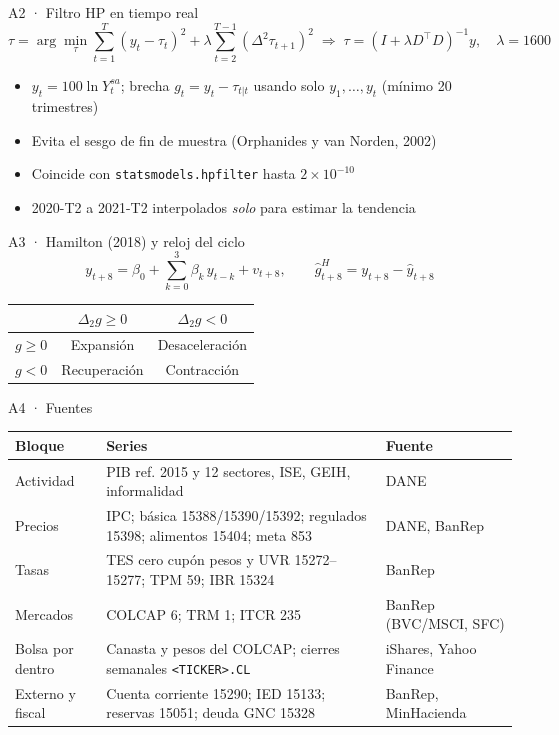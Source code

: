 \documentclass[aspectratio=169,11pt]{beamer}
\begin{document}
\begin{frame}{A2 · Filtro HP en tiempo real}
\[
\tau=\arg\min_{\tau}\sum_{t=1}^{T}(y_t-\tau_t)^2+\lambda\sum_{t=2}^{T-1}(\Delta^2\tau_{t+1})^2
\;\Rightarrow\; \tau=(I+\lambda D^\top D)^{-1}y,\quad \lambda=1600
\]
\begin{itemize}\small
\item $y_t=100\ln Y^{sa}_t$; brecha $g_t=y_t-\tau_{t|t}$ usando solo $y_1,\dots,y_t$ (mínimo 20 trimestres)
\item Evita el sesgo de fin de muestra (Orphanides y van Norden, 2002)
\item Coincide con \texttt{statsmodels.hpfilter} hasta $2\times10^{-10}$
\item 2020-T2 a 2021-T2 interpolados \emph{solo} para estimar la tendencia
\end{itemize}
\end{frame}

\begin{frame}{A3 · Hamilton (2018) y reloj del ciclo}
\[
y_{t+8}=\beta_0+\sum_{k=0}^{3}\beta_k\,y_{t-k}+v_{t+8},\qquad \hat g^{H}_{t+8}=y_{t+8}-\hat y_{t+8}
\]
\begin{center}\small
\begin{tabular}{@{}lcc@{}}
\toprule
 & $\Delta_2 g\ge0$ & $\Delta_2 g<0$\\\midrule
$g\ge0$ & \textcolor{cmgreen}{Expansión} & \textcolor{cmamber}{Desaceleración}\\
$g<0$ & \textcolor{cmblue}{Recuperación} & \textcolor{cmred}{Contracción}\\
\bottomrule
\end{tabular}
\end{center}
\end{frame}

\begin{frame}{A4 · Fuentes}
\small
\begin{tabularx}{\textwidth}{@{}lXl@{}}
\toprule
\textbf{Bloque} & \textbf{Series} & \textbf{Fuente}\\\midrule
Actividad & PIB ref. 2015 y 12 sectores, ISE, GEIH, informalidad & DANE\\
Precios & IPC; básica 15388/15390/15392; regulados 15398; alimentos 15404; meta 853 & DANE, BanRep\\
Tasas & TES cero cupón pesos y UVR 15272–15277; TPM 59; IBR 15324 & BanRep\\
Mercados & COLCAP 6; TRM 1; ITCR 235 & BanRep (BVC/MSCI, SFC)\\
Bolsa por dentro & Canasta y pesos del COLCAP; cierres semanales \texttt{<TICKER>.CL} & iShares, Yahoo Finance\\
Externo y fiscal & Cuenta corriente 15290; IED 15133; reservas 15051; deuda GNC 15328 & BanRep, MinHacienda\\
\bottomrule
\end{tabularx}
\end{frame}
\end{document}

